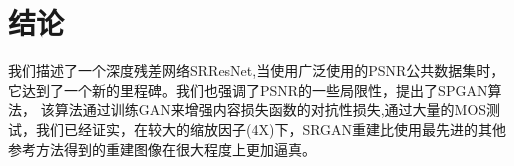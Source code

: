 \documentclass[UTF8,a4paper,10pt]{ctexart}
\begin{document}
\section{结论}
我们描述了一个深度残差网络SRResNet,当使用广泛使用的PSNR公共数据集时，它达到了一个新的里程碑。我们也强调了PSNR的一些局限性，提出了SPGAN算法，
该算法通过训练GAN来增强内容损失函数的对抗性损失,通过大量的MOS测试，我们已经证实，在较大的缩放因子(4X)下，SRGAN重建比使用最先进的其他参考方法得到的重建图像在很大程度上更加逼真。

% 
% 
\end{document}
